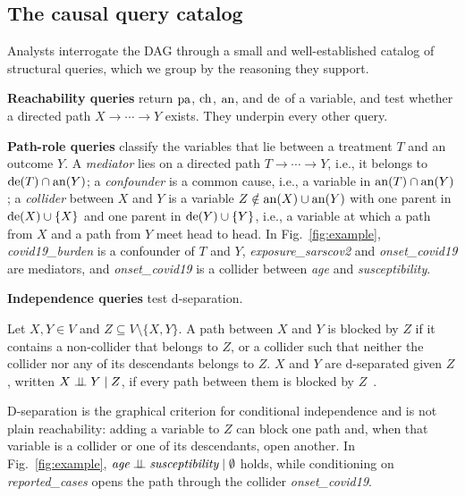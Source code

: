 \subsection{The causal query catalog}\label{sec:bg:catalog}

Analysts interrogate the DAG through a small and well-established catalog of
structural queries, which we group by the reasoning they support.

\noindent\textbf{Reachability queries} return $\mathrm{pa}$, $\mathrm{ch}$, $\mathrm{an}$, and $\mathrm{de}$
of a variable, and test whether a directed path $X \rightarrow \cdots
\rightarrow Y$ exists. They underpin every other query.

\noindent\textbf{Path-role queries} classify the variables that lie between a
treatment $T$ and an outcome $Y$. A \textit{mediator} lies on a directed path
$T \rightarrow \cdots \rightarrow Y$, i.e., it belongs to
$\mathrm{de}(T) \cap \mathrm{an}(Y)$; a \textit{confounder} is a common cause,
i.e., a variable in $\mathrm{an}(T) \cap \mathrm{an}(Y)$; a \textit{collider} between $X$ and
$Y$ is a variable $Z \notin \mathrm{an}(X) \cup \mathrm{an}(Y)$ with one parent in
$\mathrm{de}(X) \cup \{X\}$ and one parent in $\mathrm{de}(Y) \cup \{Y\}$, i.e., a variable
at which a path from $X$ and a path from $Y$ meet head to head. In
Fig.~\ref{fig:example}, \textit{covid19\_burden} is a confounder of
$T$ and $Y$, \textit{exposure\_sarscov2} and \textit{onset\_covid19} are
mediators, and \textit{onset\_covid19} is a collider between \textit{age} and
\textit{susceptibility}.

\noindent\textbf{Independence queries} test d-separation.

\begin{definition}[d-separation]
Let $X, Y \in V$ and $Z \subseteq V \setminus \{X,Y\}$. A path between $X$ and
$Y$ is blocked by $Z$ if it contains a non-collider that belongs to $Z$, or a
collider such that neither the collider nor any of its descendants belongs to
$Z$. $X$ and $Y$ are d-separated given $Z$, written $X \perp\!\!\!\perp Y \mid Z$, if
every path between them is blocked by $Z$~\cite{pearl2009causality}.
\end{definition}

D-separation is the graphical criterion for conditional independence and is
not plain reachability: adding a variable to $Z$ can block one path and, when
that variable is a collider or one of its descendants, open another. In
Fig.~\ref{fig:example}, $\textit{age} \perp\!\!\!\perp \textit{susceptibility} \mid
\emptyset$ holds, while conditioning on \textit{reported\_cases} opens the
path through the collider \textit{onset\_covid19}.

